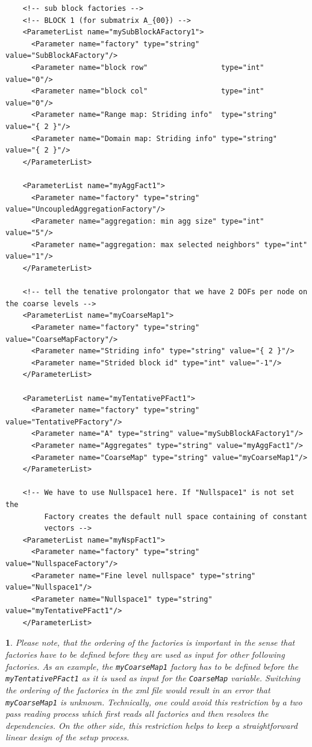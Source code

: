 \documentclass[10pt,fleqn]{book}
\newtheorem*{mycomment}{\ding{42}}
\begin{document}
\begin{lstlisting}
    <!-- sub block factories -->
    <!-- BLOCK 1 (for submatrix A_{00}) -->
    <ParameterList name="mySubBlockAFactory1">
      <Parameter name="factory" type="string" value="SubBlockAFactory"/>
      <Parameter name="block row"                 type="int"     value="0"/>
      <Parameter name="block col"                 type="int"     value="0"/>
      <Parameter name="Range map: Striding info"  type="string"  value="{ 2 }"/>
      <Parameter name="Domain map: Striding info" type="string"  value="{ 2 }"/>
    </ParameterList>

    <ParameterList name="myAggFact1">
      <Parameter name="factory" type="string" value="UncoupledAggregationFactory"/>
      <Parameter name="aggregation: min agg size" type="int" value="5"/>
      <Parameter name="aggregation: max selected neighbors" type="int" value="1"/>
    </ParameterList>

    <!-- tell the tenative prolongator that we have 2 DOFs per node on the coarse levels -->
    <ParameterList name="myCoarseMap1">
      <Parameter name="factory" type="string" value="CoarseMapFactory"/>
      <Parameter name="Striding info" type="string" value="{ 2 }"/>
      <Parameter name="Strided block id" type="int" value="-1"/>
    </ParameterList>

    <ParameterList name="myTentativePFact1">
      <Parameter name="factory" type="string" value="TentativePFactory"/>
      <Parameter name="A" type="string" value="mySubBlockAFactory1"/>
      <Parameter name="Aggregates" type="string" value="myAggFact1"/>
      <Parameter name="CoarseMap" type="string" value="myCoarseMap1"/>
    </ParameterList>

    <!-- We have to use Nullspace1 here. If "Nullspace1" is not set the 
         Factory creates the default null space containing of constant 
         vectors -->
    <ParameterList name="myNspFact1">
      <Parameter name="factory" type="string" value="NullspaceFactory"/>
      <Parameter name="Fine level nullspace" type="string" value="Nullspace1"/>
      <Parameter name="Nullspace1" type="string" value="myTentativePFact1"/>
    </ParameterList>
\end{lstlisting}

\begin{mycomment}
Please note, that the ordering of the factories is important in the sense that factories have to be defined before they are used as input
for other following factories. As an example, the \texttt{myCoarseMap1} factory has to be defined before the \texttt{myTentativePFact1} as it is used as input for the \texttt{CoarseMap} variable. Switching the ordering of the factories in the xml file would result in an error that \texttt{myCoarseMap1} is unknown. Technically, one could avoid this restriction by a two pass reading process which first reads all factories and then resolves the dependencies. On the other side, this restriction helps to keep a straightforward linear design of the setup process.
\end{mycomment}
\end{document}
